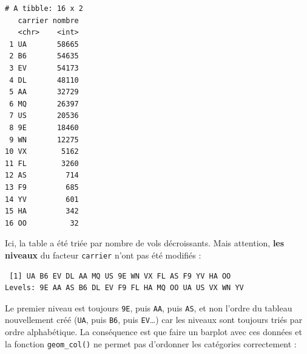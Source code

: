\documentclass[a4paperpaper,]{article}
\newenvironment{Shaded}{\begin{snugshade}}{\end{snugshade}}
\newcommand{\CommentTok}[1]{\textcolor[rgb]{0.54,0.53,0.53}{#1}}
\newcommand{\DataTypeTok}[1]{\textcolor[rgb]{0.00,0.34,0.68}{#1}}
\newcommand{\KeywordTok}[1]{\textcolor[rgb]{0.12,0.11,0.11}{\textbf{#1}}}
\newcommand{\NormalTok}[1]{\textcolor[rgb]{0.12,0.11,0.11}{#1}}
\newcommand{\OperatorTok}[1]{\textcolor[rgb]{0.12,0.11,0.11}{#1}}
\newcommand{\StringTok}[1]{\textcolor[rgb]{0.75,0.01,0.01}{#1}}
\theoremstyle{definition}
\theoremstyle{definition}
\theoremstyle{definition}
\theoremstyle{remark}
\begin{document}
\begin{Shaded}
\end{Shaded}

\begin{verbatim}
# A tibble: 16 x 2
   carrier nombre
   <chr>    <int>
 1 UA       58665
 2 B6       54635
 3 EV       54173
 4 DL       48110
 5 AA       32729
 6 MQ       26397
 7 US       20536
 8 9E       18460
 9 WN       12275
10 VX        5162
11 FL        3260
12 AS         714
13 F9         685
14 YV         601
15 HA         342
16 OO          32
\end{verbatim}

Ici, la table a été triée par nombre de vols décroissants. Mais
attention, \textbf{les niveaux} du facteur \texttt{carrier} n'ont pas
été modifiés :

\begin{Shaded}
\end{Shaded}

\begin{verbatim}
 [1] UA B6 EV DL AA MQ US 9E WN VX FL AS F9 YV HA OO
Levels: 9E AA AS B6 DL EV F9 FL HA MQ OO UA US VX WN YV
\end{verbatim}

Le premier niveau est toujours \texttt{9E}, puis \texttt{AA}, puis
\texttt{AS}, et non l'ordre du tableau nouvellement créé (\texttt{UA},
puis \texttt{B6}, puis \texttt{EV}\ldots{}) car les niveaux sont
toujours triés par ordre alphabétique. La conséquence est que faire un
barplot avec ces données et la fonction \texttt{geom\_col()} ne permet
pas d'ordonner les catégories correctement :
\end{document}
